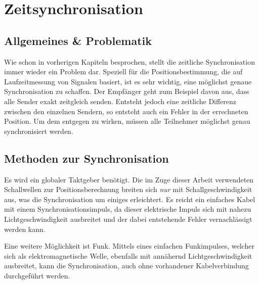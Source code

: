 \chapter{Zeitsynchronisation}
\label{cha:Synchronisation}
\section{Allgemeines \& Problematik}
Wie schon in vorherigen Kapiteln besprochen, stellt die zeitliche Synchronisation immer wieder ein Problem dar. Speziell für die Positionsbestimmung, die auf Laufzeitmessung von Signalen basiert, ist es sehr wichtig, eine möglichst genaue Synchronisation zu schaffen. Der Empfänger geht zum Beispiel davon aus, dass alle Sender exakt zeitgleich senden. Entsteht jedoch eine zeitliche Differenz zwischen den einzelnen Sendern, so entsteht auch ein Fehler in der errechneten Position. Um dem entgegen zu wirken, müssen alle Teilnehmer möglichst genau synchronisiert werden.

\section{Methoden zur Synchronisation}
Es wird ein globaler Taktgeber benötigt. Die im Zuge dieser Arbeit verwendeten Schallwellen zur Positionsberechnung breiten sich \emph{nur} mit Schallgeschwindigkeit aus, was die Synchronisation um einiges erleichtert. Es reicht ein einfaches Kabel mit einem Synchronisationsimpuls, da dieser elektrische Impuls sich mit nahezu Lichtgeschwindigkeit ausbreitet und der dabei entstehende Fehler vernachlässigt werden kann. 

Eine weitere Möglichkeit ist Funk. Mittels eines einfachen Funkimpulses, welcher sich als elektromagnetische Welle, ebenfalls mit annähernd Lichtgeschwindigkeit ausbreitet, kann die Synchronisation, auch ohne vorhandener Kabelverbindung durchgeführt werden.